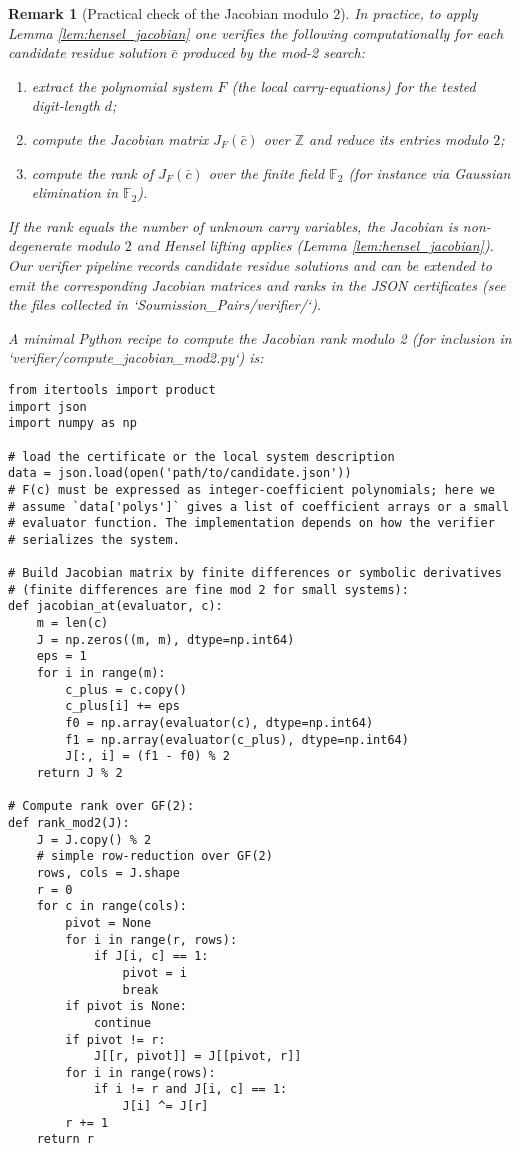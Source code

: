 \documentclass[12pt,a4paper]{article}
\newtheorem{remark}[theorem]{Remark}
\begin{document}
\begin{remark}[Practical check of the Jacobian modulo $2$]
In practice, to apply Lemma \ref{lem:hensel_jacobian} one verifies the following computationally for each candidate residue solution $\bar c$ produced by the mod-2 search:

\begin{enumerate}
\item extract the polynomial system $F$ (the local carry-equations) for the tested digit-length $d$;
\item compute the Jacobian matrix $J_F(\bar c)$ over $\mathbb Z$ and reduce its entries modulo $2$;
\item compute the rank of $J_F(\bar c)$ over the finite field $\mathbb F_2$ (for instance via Gaussian elimination in $\mathbb F_2$).
\end{enumerate}

If the rank equals the number of unknown carry variables, the Jacobian is non-degenerate modulo $2$ and Hensel lifting applies (Lemma \ref{lem:hensel_jacobian}). Our verifier pipeline records candidate residue solutions and can be extended to emit the corresponding Jacobian matrices and ranks in the JSON certificates (see the files collected in `Soumission_Pairs/verifier/`).

A minimal Python recipe to compute the Jacobian rank modulo 2 (for inclusion in `verifier/compute_jacobian_mod2.py`) is:

\begin{verbatim}
from itertools import product
import json
import numpy as np

# load the certificate or the local system description
data = json.load(open('path/to/candidate.json'))
# F(c) must be expressed as integer-coefficient polynomials; here we
# assume `data['polys']` gives a list of coefficient arrays or a small
# evaluator function. The implementation depends on how the verifier
# serializes the system.

# Build Jacobian matrix by finite differences or symbolic derivatives
# (finite differences are fine mod 2 for small systems):
def jacobian_at(evaluator, c):
	m = len(c)
	J = np.zeros((m, m), dtype=np.int64)
	eps = 1
	for i in range(m):
		c_plus = c.copy()
		c_plus[i] += eps
		f0 = np.array(evaluator(c), dtype=np.int64)
		f1 = np.array(evaluator(c_plus), dtype=np.int64)
		J[:, i] = (f1 - f0) % 2
	return J % 2

# Compute rank over GF(2):
def rank_mod2(J):
	J = J.copy() % 2
	# simple row-reduction over GF(2)
	rows, cols = J.shape
	r = 0
	for c in range(cols):
		pivot = None
		for i in range(r, rows):
			if J[i, c] == 1:
				pivot = i
				break
		if pivot is None:
			continue
		if pivot != r:
			J[[r, pivot]] = J[[pivot, r]]
		for i in range(rows):
			if i != r and J[i, c] == 1:
				J[i] ^= J[r]
		r += 1
	return r


\end{verbatim}
\end{remark}
\end{document}
